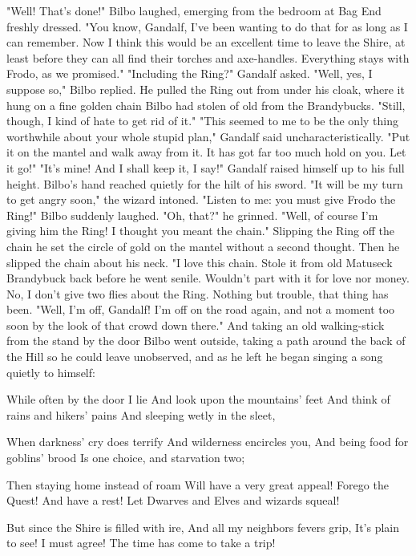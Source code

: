      "Well! That's done!" Bilbo laughed, emerging from the bedroom at Bag 
End freshly dressed. "You know, Gandalf, I've been wanting to do that for 
as long as I can remember. Now I think this would be an excellent time to 
leave the Shire, at least before they can all find their torches and 
axe-handles. Everything stays with Frodo, as we promised."
     "Including the Ring?" Gandalf asked.
     "Well, yes, I suppose so," Bilbo replied. He pulled the Ring out 
from under his cloak, where it hung on a fine golden chain Bilbo had 
stolen of old from the Brandybucks. "Still, though, I kind of hate to get 
rid of it."
     "This seemed to me to be the only thing worthwhile about your whole 
stupid plan," Gandalf said uncharacteristically. "Put it on the mantel 
and walk away from it. It has got far too much hold on you. Let it go!"
     "It's mine! And I shall keep it, I say!"
     Gandalf raised himself up to his full height. Bilbo's hand reached 
quietly for the hilt of his sword. "It will be my turn to get angry 
soon," the wizard intoned. "Listen to me: you must give Frodo the Ring!"
     Bilbo suddenly laughed. "Oh, that?" he grinned. "Well, of course 
I'm giving him the Ring! I thought you meant the chain." Slipping the 
Ring off the chain he set the circle of gold on the mantel without a 
second thought. Then he slipped the chain about his neck. "I love this 
chain. Stole it from old Matuseck Brandybuck back before he went senile. 
Wouldn't part with it for love nor money. No, I don't give two flies 
about the Ring. Nothing but trouble, that thing has been.
     "Well, I'm off, Gandalf! I'm off on the road again, and not a moment 
too soon by the look of that crowd down there." And taking an old 
walking-stick from the stand by the door Bilbo went outside, taking a 
path around the back of the Hill so he could leave unobserved, and as he 
left he began singing a song quietly to himself:

      While often by the door I lie
      And look upon the mountains' feet
      And think of rains and hikers' pains
      And sleeping wetly in the sleet,

      When darkness' cry does terrify
      And wilderness encircles you,
      And being food for goblins' brood
      Is one choice, and starvation two;

      Then staying home instead of roam
      Will have a very great appeal!
      Forego the Quest! And have a rest!
      Let Dwarves and Elves and wizards squeal!

      But since the Shire is filled with ire,
      And all my neighbors fevers grip,
      It's plain to see! I must agree!
      The time has come to take a trip!

